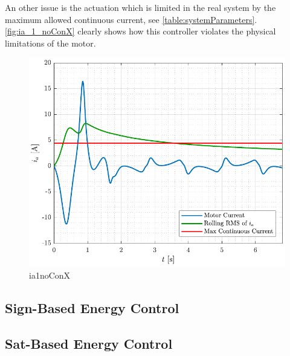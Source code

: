 %
An other issue is the actuation which is limited in the real system by the maximum allowed continuous current, see \autoref{table:systemParameters}. \autoref{fig:ia_1_noConX} clearly shows how this controller violates the physical limitations of the motor.
\begin{figure}[H]
  \includegraphics[width=.5\textwidth]{figures/ia_1_noConX}
  \caption{ia1noConX}
  \label{fig:ia_1_noConX}
\end{figure}



\subsection{Sign-Based Energy Control}




\subsection{Sat-Based Energy Control}













